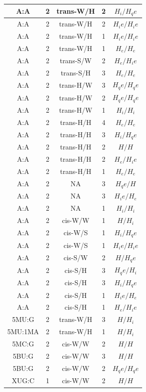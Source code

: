 \begin{center}
\begin{longtable}{c|c|c|c|c}
A:A & 2 & trans-W/H & 2 & $H_i/H_qe$ \\  \hline
A:A & 2 & trans-W/H & 2 & $H_ie/H_ie$ \\  \hline
A:A & 2 & trans-W/H & 1 & $H_ie/H_ie$ \\  \hline
A:A & 2 & trans-W/H & 1 & $H_e/H_e$ \\  \hline
A:A & 2 & trans-S/W & 2 & $H_e/H_ie$ \\  \hline
A:A & 2 & trans-S/H & 3 & $H_e/H_e$ \\  \hline
A:A & 2 & trans-H/W & 3 & $H_qe/H_qe$ \\  \hline
A:A & 2 & trans-H/W & 2 & $H_qe/H_qe$ \\  \hline
A:A & 2 & trans-H/W & 1 & $H_i/H_i$ \\  \hline
A:A & 2 & trans-H/H & 4 & $H_e/H_e$ \\  \hline
A:A & 2 & trans-H/H & 3 & $H_i/H_qe$ \\  \hline
A:A & 2 & trans-H/H & 2 & $H/H$ \\  \hline
A:A & 2 & trans-H/H & 2 & $H_e/H_ie$ \\  \hline
A:A & 2 & trans-H/H & 1 & $H_e/H_e$ \\  \hline
A:A & 2 & NA & 3 & $H_qe/H$ \\  \hline
A:A & 2 & NA & 3 & $H_ie/H_e$ \\  \hline
A:A & 2 & NA & 1 & $H_i/H_i$ \\  \hline
A:A & 2 & cis-W/W & 1 & $H/H_i$ \\  \hline
A:A & 2 & cis-W/S & 1 & $H_i/H_qe$ \\  \hline
A:A & 2 & cis-W/S & 1 & $H_ie/H_ie$ \\  \hline
A:A & 2 & cis-S/W & 2 & $H/H_qe$ \\  \hline
A:A & 2 & cis-S/H & 3 & $H_qe/H_i$ \\  \hline
A:A & 2 & cis-S/H & 3 & $H_i/H_qe$ \\  \hline
A:A & 2 & cis-S/H & 1 & $H_ie/H_e$ \\  \hline
A:A & 2 & cis-S/H & 1 & $H_e/H_ie$ \\  \hline
5MU:G & 2 & trans-W/H & 3 & $H/H_i$ \\  \hline
5MU:1MA & 2 & trans-W/H & 1 & $H/H_i$ \\  \hline
5MC:G & 2 & cis-W/W & 2 & $H/H$ \\  \hline
5BU:G & 2 & cis-W/W & 3 & $H/H$ \\  \hline
5BU:G & 2 & cis-W/W & 2 & $H_qe/H_qe$ \\  \hline
XUG:C & 1 & cis-W/W & 2 & $H/H$ \\  \hline

\end{longtable}
\end{center}
